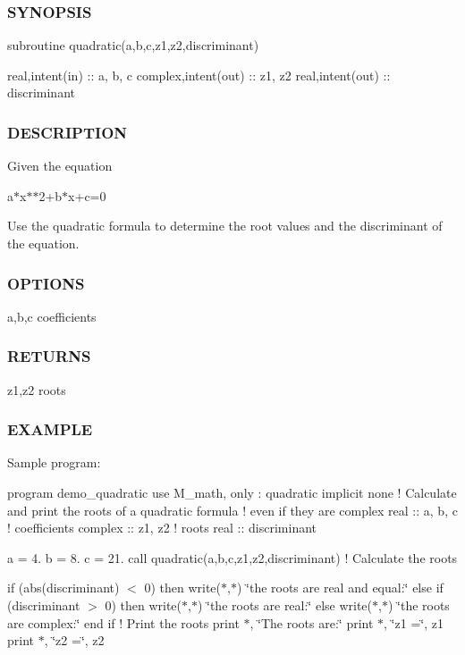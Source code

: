 \subsubsection*{S\+Y\+N\+O\+P\+S\+IS}

subroutine quadratic(a,b,c,z1,z2,discriminant)

real,intent(in) \+:\+: a, b, c complex,intent(out) \+:\+: z1, z2 real,intent(out) \+:\+: discriminant

\subsubsection*{D\+E\+S\+C\+R\+I\+P\+T\+I\+ON}

Given the equation

a$\ast$x$\ast$$\ast$2+b$\ast$x+c=0

Use the quadratic formula to determine the root values and the discriminant of the equation.

\subsubsection*{O\+P\+T\+I\+O\+NS}

a,b,c coefficients

\subsubsection*{R\+E\+T\+U\+R\+NS}

z1,z2 roots

\subsubsection*{E\+X\+A\+M\+P\+LE}

Sample program\+:

program demo\+\_\+quadratic use M\+\_\+math, only \+: quadratic implicit none ! Calculate and print the roots of a quadratic formula ! even if they are complex real \+:\+: a, b, c ! coefficients complex \+:\+: z1, z2 ! roots real \+:\+: discriminant

a = 4. b = 8. c = 21. call quadratic(a,b,c,z1,z2,discriminant) ! Calculate the roots

if (abs(discriminant) $<$ 0) then write($\ast$,$\ast$) \char`\"{}the roots are real and equal\+:\char`\"{} else if (discriminant $>$ 0) then write($\ast$,$\ast$) \char`\"{}the roots are real\+:\char`\"{} else write($\ast$,$\ast$) \char`\"{}the roots are complex\+:\char`\"{} end if ! Print the roots print $\ast$, \char`\"{}\+The roots are\+:\char`\"{} print $\ast$, \char`\"{}z1 =\char`\"{}, z1 print $\ast$, \char`\"{}z2 =\char`\"{}, z2

